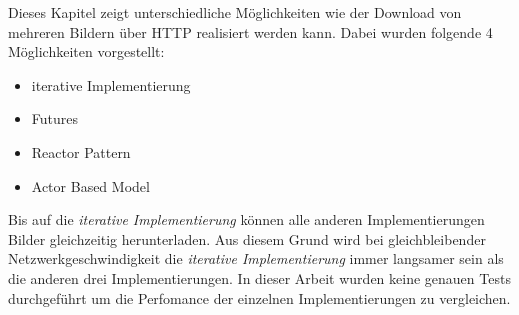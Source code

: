 Dieses Kapitel zeigt unterschiedliche Möglichkeiten wie der Download von mehreren Bildern über HTTP realisiert werden kann. Dabei wurden folgende 4 Möglichkeiten vorgestellt: 

\begin{itemize}
  \item iterative Implementierung
  \item Futures
  \item Reactor Pattern
  \item Actor Based Model
\end{itemize}

Bis auf die \emph{iterative Implementierung} können alle anderen Implementierungen Bilder gleichzeitig herunterladen. Aus diesem Grund wird bei gleichbleibender Netzwerkgeschwindigkeit die \emph{iterative Implementierung} immer langsamer sein als die anderen drei Implementierungen. In dieser Arbeit wurden keine genauen Tests durchgeführt um die Perfomance der einzelnen Implementierungen zu vergleichen.
